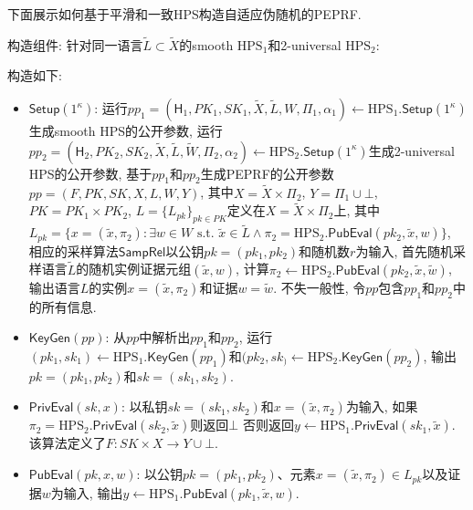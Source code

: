 下面展示如何基于平滑和一致HPS构造自适应伪随机的PEPRF. 
\begin{construction}[基于平滑和一致HPS的PEPRF构造]\label{construction:SUHPS-to-PEPRF}
\begin{trivlist}
\item 构造组件: 针对同一语言$\tilde{L} \subset \tilde{X}$的smooth $\text{HPS}_1$和2-universal $\text{HPS}_2$:
\end{trivlist}
构造如下:  
\begin{itemize}
\item $\mathsf{Setup}(1^\kappa)$: 运行$pp_1 = (\mathsf{H}_1, PK_1, SK_1, \tilde{X}, \tilde{L}, W, \Pi_1, \alpha_1) \leftarrow 
    \text{HPS}_1.\mathsf{Setup}(1^\kappa)$生成smooth HPS的公开参数, 
    运行$pp_2 = (\mathsf{H}_2, PK_2, SK_2, \tilde{X}, \tilde{L}, \tilde{W}, \Pi_2, \alpha_2) \leftarrow 
    \text{HPS}_2.\mathsf{Setup}(1^\kappa)$生成2-universal HPS的公开参数, 
    基于$pp_1$和$pp_2$生成PEPRF的公开参数$pp = (F, PK, SK, X, L, W, Y)$, 
    其中$X = \tilde{X} \times \Pi_2$, $Y = \Pi_1 \cup \bot$, $PK = PK_1 \times PK_2$, 
    $L = \{L_{pk}\}_{pk \in PK}$定义在$X = \tilde{X} \times \Pi_2$上, 
    其中$L_{pk} = \{x = (\tilde{x}, \pi_2): \exists w \in W \text{~s.t.~}
    \tilde{x} \in \tilde{L} \wedge \pi_2 = \text{HPS}_2.\mathsf{PubEval}(pk_2, \tilde{x}, w)\}$, 
    相应的采样算法$\mathsf{SampRel}$以公钥$pk = (pk_1, pk_2)$和随机数$r$为输入, 首先随机采样语言$\tilde{L}$的随机实例证据元组$(\tilde{x}, w)$, 
    计算$\pi_2 \leftarrow \text{HPS}_2.\mathsf{PubEval}(pk_2, \tilde{x}, \tilde{w})$, 
    输出语言$L$的实例$x = (\tilde{x}, \pi_2)$和证据$w = \tilde{w}$.  
    不失一般性, 令$pp$包含$pp_1$和$pp_2$中的所有信息. 

\item $\mathsf{KeyGen}(pp)$: 从$pp$中解析出$pp_1$和$pp_2$, 
    运行$(pk_1, sk_1) \leftarrow \text{HPS}_1.\mathsf{KeyGen}(pp_1)$和$(pk_2, sk_) \leftarrow \text{HPS}_2.\mathsf{KeyGen}(pp_2)$,  
    输出$pk = (pk_1, pk_2)$和$sk = (sk_1, sk_2)$.  

\item $\mathsf{PrivEval}(sk, x)$: 以私钥$sk = (sk_1, sk_2)$和$x = (\tilde{x}, \pi_2)$为输入, 
    如果$\pi_2 = \text{HPS}_2.\mathsf{PrivEval}(sk_2, \tilde{x})$则返回$\bot$ 
    否则返回$y \leftarrow \text{HPS}_1.\mathsf{PrivEval}(sk_1, \tilde{x})$. 
    该算法定义了$F: SK \times X \rightarrow Y \cup \bot$.  

\item $\mathsf{PubEval}(pk, x, w)$: 以公钥$pk = (pk_1, pk_2)$、元素$x = (\tilde{x}, \pi_2) \in L_{pk}$以及证据$w$为输入, 
    输出$y \leftarrow \text{HPS}_1.\mathsf{PubEval}(pk_1, \tilde{x}, w)$. 
\end{itemize}  
\end{construction}

